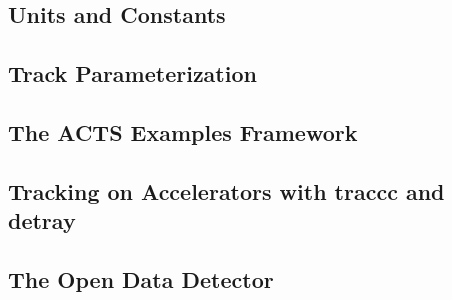 
\subsection{Units and Constants}

\subsection{Track Parameterization}

\subsection{The ACTS Examples Framework}


\subsection{Tracking on Accelerators with traccc and detray}


\subsection{The Open Data Detector}

